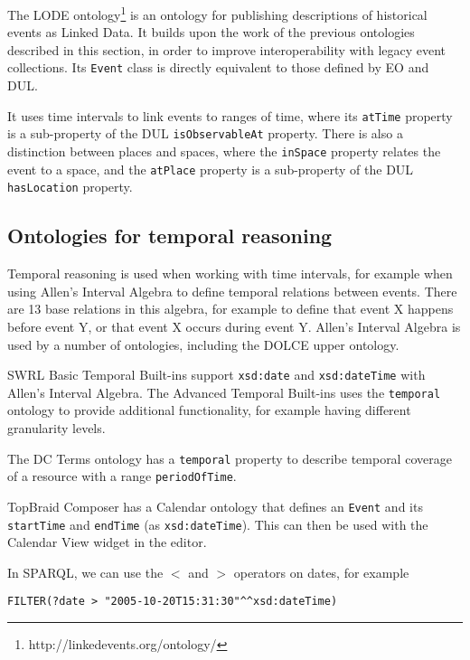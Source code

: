 The \ac{LODE} ontology\footnote{http://linkedevents.org/ontology/} is an ontology for publishing descriptions of historical events as Linked Data. It builds upon the work of the previous ontologies described in this section, in order to improve interoperability with legacy event collections. Its \texttt{Event} class is directly equivalent to those defined by \ac{EO} and \ac{DUL}. 

It uses time intervals to link events to ranges of time, where its \texttt{atTime} property is a sub-property of the \ac{DUL} \texttt{isObservableAt} property. There is also a distinction between places and spaces, where the \texttt{inSpace} property relates the event to a space, and the \texttt{atPlace} property is a sub-property of the \ac{DUL} \texttt{hasLocation} property.


\subsection{Ontologies for temporal reasoning}
\label{TemporalReasoning}

Temporal reasoning is used when working with time intervals, for example when using Allen's Interval Algebra to define temporal relations between events. There are 13 base relations in this algebra, for example to define that event X happens before event Y, or that event X occurs during event Y. Allen's Interval Algebra is used by a number of ontologies, including the \ac{DOLCE} \cite{Scherp2011} upper ontology. 

\ac{SWRL} Basic Temporal Built-ins support \texttt{xsd:date} and \texttt{xsd:dateTime} with Allen's Interval Algebra. The Advanced Temporal Built-ins uses the \texttt{temporal} ontology \cite{OConnor2010} to provide additional functionality, for example having different granularity levels.


The \ac{DC} Terms ontology has a \texttt{temporal} property to describe temporal coverage of a resource with a range \texttt{periodOfTime}.

TopBraid Composer has a Calendar ontology that defines an \texttt{Event} and its \texttt{startTime} and \texttt{endTime} (as \texttt{xsd:dateTime}). This can then be used with the Calendar View widget in the editor. 

In \ac{SPARQL}, we can use the $<$ and $>$ operators on dates, for example 

\begin{verbatim}
FILTER(?date > "2005-10-20T15:31:30"^^xsd:dateTime)
\end{verbatim}

